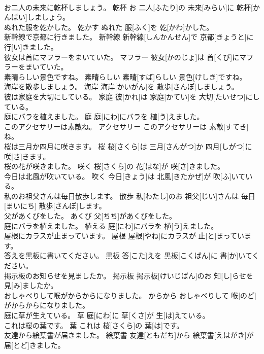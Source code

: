\documentclass[8pt]{extreport}
\begin{document}
\begin{CJK}{UTF8}{min}
\\	お二人の未来に乾杯しましょう。	乾杯	お 二人[ふたり]の 未来[みらい]に 乾杯[かんぱい]しましょう。	
\\	ぬれた服を乾かした。	乾かす	ぬれた 服[ふく]を 乾[かわ]かした。	
\\	新幹線で京都に行きました。	新幹線	新幹線[しんかんせん]で 京都[きょうと]に 行[い]きました。	
\\	彼女は首にマフラーをまいていた。	マフラー	彼女[かのじょ]は 首[くび]にマフラーをまいていた。	
\\	素晴らしい景色ですね。	素晴らしい	素晴[すば]らしい 景色[けしき]ですね。	
\\	海岸を散歩しましょう。	海岸	海岸[かいがん]を 散歩[さんぽ]しましょう。	
\\	彼は家庭を大切にしている。	家庭	彼[かれ]は 家庭[かてい]を 大切[たいせつ]にしている。	
\\	庭にバラを植えました。	庭	庭[にわ]にバラを 植[う]えました。	
\\	このアクセサリーは素敵ね。	アクセサリー	このアクセサリーは 素敵[すてき]ね。	
\\	桜は三月か四月に咲きます。	桜	桜[さくら]は 三月[さんがつ]か 四月[しがつ]に 咲[さ]きます。	
\\	桜の花が咲きました。	咲く	桜[さくら]の 花[はな]が 咲[さ]きました。	
\\	今日は北風が吹いている。	吹く	今日[きょう]は 北風[きたかぜ]が 吹[ふ]いている。	
\\	私のお祖父さんは毎日散歩します。	散歩	私[わたし]のお 祖父[じい]さんは 毎日[まいにち] 散歩[さんぽ]します。	
\\	父があくびをした。	あくび	父[ちち]があくびをした。	
\\	庭にバラを植えました。	植える	庭[にわ]にバラを 植[う]えました。	
\\	屋根にカラスが止まっています。	屋根	屋根[やね]にカラスが 止[と]まっています。	
\\	答えを黒板に書いてください。	黒板	答[こた]えを 黒板[こくばん]に 書[か]いてください。	
\\	掲示板のお知らせを見ましたか。	掲示板	掲示板[けいじばん]のお 知[し]らせを 見[み]ましたか。	
\\	おしゃべりして喉がからからになりました。	からから	おしゃべりして 喉[のど]がからからになりました。	
\\	庭に草が生えている。	草	庭[にわ]に 草[くさ]が 生[は]えている。	
\\	これは桜の葉です。	葉	これは 桜[さくら]の 葉[は]です。	
\\	友達から絵葉書が届きました。	絵葉書	友達[ともだち]から 絵葉書[えはがき]が 届[とど]きました。	

\end{CJK}
\end{document}
